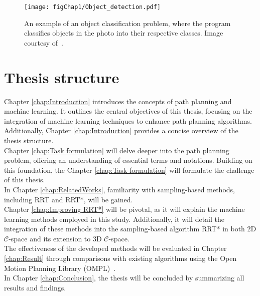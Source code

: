 \documentclass{ctuthesis}
\begin{document}
\begin{figure}
  \centering
  \texttt{[image: figChap1/Object\_detection.pdf]}
  \caption{An example of an object classification problem, 
  where the program classifies objects in the photo into their respective classes.
  Image courtesy of~\cite{ObjectDetection}.}
  \label{fig:ObjectDetection}
\end{figure} 
 
\section{Thesis structure}

Chapter \ref{chap:Introduction} introduces the concepts of path planning and machine learning. 
It outlines the central objectives of this thesis, focusing on the integration of machine learning techniques to enhance path planning algorithms. 
Additionally, Chapter \ref{chap:Introduction} provides a concise overview of the thesis structure.\\[12pt]
Chapter \ref{chap:Task formulation} will delve deeper into the path planning problem, 
offering an understanding of essential terms and notations. 
Building on this foundation, the Chapter \ref{chap:Task formulation} will formulate the challenge of this thesis.\\[12pt]
In Chapter \ref{chap:RelatedWorks}, familiarity with sampling-based methods, including RRT and RRT*, will be gained.\\[12pt]
Chapter \ref{chap:Improving RRT*} will be pivotal, 
as it will explain the machine learning methods employed in this study. 
Additionally, it will detail the integration of these methods into the sampling-based algorithm RRT* in both 2D $\mathcal{C}$-space and its extension to 3D $\mathcal{C}$-space.\\[12pt]
The effectiveness of the developed methods will be evaluated in Chapter \ref{chap:Result} through comparisons with existing algorithms 
using the Open Motion Planning Library (OMPL)~\cite{Ioan2012ompl}.\\[12pt]
In Chapter \ref{chap:Conclusion}, the thesis will be concluded by summarizing all results and findings.
\end{document}
